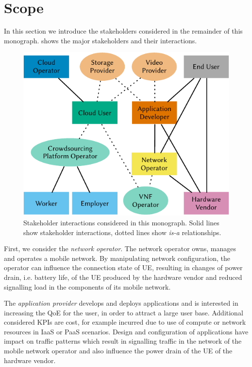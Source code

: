 \section{Scope}\label{sec:introduction:considered_stakeholders}

In this section we introduce the stakeholders considered in the remainder of this monograph.
 shows the major stakeholders and their interactions.

\begin{figure}
\centering
\includegraphics{figures/stakeholders}
\caption{Stakeholder interactions considered in this monograph. Solid lines show stakeholder interactions, dotted lines show \emph{is-a} relationships.}\label{fig:introduction:stakeholders}
\end{figure}

First, we consider the \emph{network operator}.
The network operator owns, manages and operates a mobile network.
By manipulating network configuration, the operator can influence the connection state of \gls{UE}, resulting in changes of power drain, i.e. battery life, of the \gls{UE} produced by the hardware vendor and reduced signalling load in the components of its mobile network.

The \emph{application provider} develops and deploys applications and is interested in increasing the \gls{QoE} for the user, in order to attract a large user base.
Additional considered \glspl{KPI} are cost, for example incurred due to use of compute or network resources in \gls{IaaS} or \gls{PaaS} scenarios.
Design and configuration of applications have impact on traffic patterns which result in signalling traffic in the network of the mobile network operator and also influence the power drain of the \gls{UE} of the hardware vendor.

